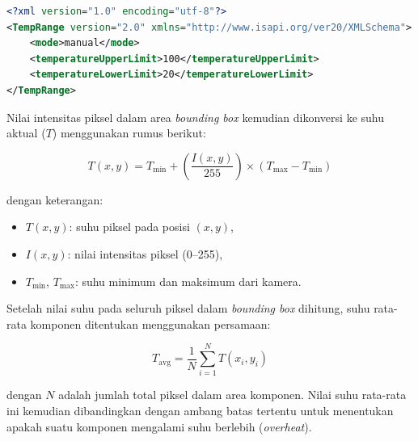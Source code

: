 \begin{lstlisting}[language=XML]
<?xml version="1.0" encoding="utf-8"?>
<TempRange version="2.0" xmlns="http://www.isapi.org/ver20/XMLSchema">
    <mode>manual</mode>
    <temperatureUpperLimit>100</temperatureUpperLimit>
    <temperatureLowerLimit>20</temperatureLowerLimit>
</TempRange>
\end{lstlisting}

Nilai intensitas piksel dalam area \emph{bounding box} kemudian dikonversi ke suhu aktual (\(T\)) menggunakan rumus berikut:

\begin{equation}
T(x, y) = T_{\text{min}} + \left( \frac{I(x, y)}{255} \right) \times (T_{\text{max}} - T_{\text{min}})
\label{eq:suhu-piksel}
\end{equation}

\noindent
dengan keterangan:
\begin{itemize}
  \item \( T(x, y) \): suhu piksel pada posisi \((x, y)\),
  \item \( I(x, y) \): nilai intensitas piksel (0–255),
  \item \( T_{\text{min}} \), \( T_{\text{max}} \): suhu minimum dan maksimum dari kamera.
\end{itemize}

Setelah nilai suhu pada seluruh piksel dalam \emph{bounding box} dihitung, suhu rata-rata komponen ditentukan menggunakan persamaan:

\begin{equation}
T_{\text{avg}} = \frac{1}{N} \sum_{i=1}^{N} T(x_i, y_i)
\label{eq:rata-rata-suhu}
\end{equation}

\noindent
dengan \( N \) adalah jumlah total piksel dalam area komponen. Nilai suhu rata-rata ini kemudian dibandingkan dengan ambang batas tertentu untuk menentukan apakah suatu komponen mengalami suhu berlebih (\emph{overheat}).


